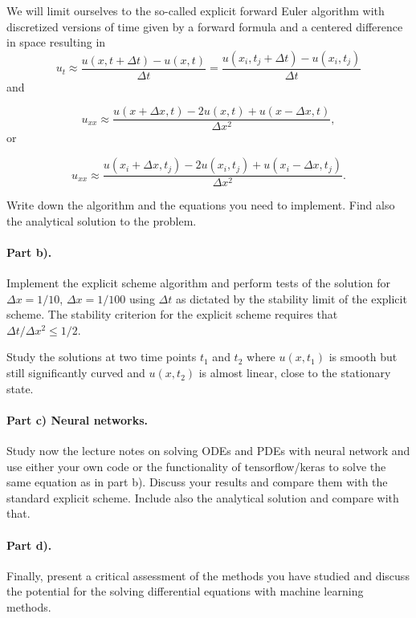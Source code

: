 \documentclass[%
oneside,                 %
final,                   %
10pt]{article}
\begin{document}
We will limit ourselves to the so-called explicit forward Euler algorithm with discretized versions of time given by a forward formula and a centered difference in space resulting in   
\begin{equation*} 
u_t\approx \frac{u(x,t+\Delta t)-u(x,t)}{\Delta t}=\frac{u(x_i,t_j+\Delta t)-u(x_i,t_j)}{\Delta t}
\end{equation*}
and

\begin{equation*}
u_{xx}\approx \frac{u(x+\Delta x,t)-2u(x,t)+u(x-\Delta x,t)}{\Delta x^2},
\end{equation*}
or

\begin{equation*}
u_{xx}\approx \frac{u(x_i+\Delta x,t_j)-2u(x_i,t_j)+u(x_i-\Delta x,t_j)}{\Delta x^2}.
\end{equation*}

Write down the algorithm and the equations you need to implement.
Find also the analytical solution to the problem. 

\paragraph{Part b).}
Implement the explicit scheme  algorithm and perform tests of the solution 
for $\Delta x=1/10$, $\Delta x=1/100$ using  $\Delta t$ as dictated by the stability limit of the explicit scheme. The stability criterion for the explicit scheme requires that $\Delta t/\Delta x^2 \leq 1/2$. 

Study the solutions at two time points $t_1$ and $t_2$ where $u(x,t_1)$ is smooth but still significantly curved
and $u(x,t_2)$ is almost linear, close to the stationary state.


\paragraph{Part c) Neural networks.}
Study now the lecture notes on solving ODEs and PDEs with neural network and use either your own code or the functionality of tensorflow/keras to solve the same equation as in part b). 
Discuss your results and compare them with the standard explicit scheme. Include also the analytical solution and compare with that.

\paragraph{Part d).}
Finally, present a critical assessment of the methods you have studied and discuss the potential for the solving differential equations with machine learning methods. 
\end{document}
